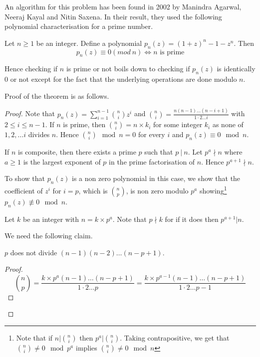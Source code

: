 An algorithm for this problem has been found in 2002 by Manindra Agarwal,
Neeraj Kayal and Nitin Saxena. In their result, they used the following
polynomial characterisation for a prime number.
\begin{theorem} Let $n \ge 1$ be
	an integer. Define a polynomial 
	$p_n(z) = (1+z)^n - 1 - z^n$. Then \[ p_n(z) \equiv 0 (mod~ n)
	\iff n \text{ is prime} \]
\end{theorem}
Hence checking if $n$ is prime or not boils down to checking if $p_n(z)$ is
identically $0$ or not except for the fact that the underlying operations are
done modulo $n$.

Proof of the theorem is as follows.
\begin{proof}
	Note that $p_n(z) = \sum_{i=1}^{n-1} \binom{n}{i} z^i$ and
	$\binom{n}{i} = \frac{n(n-1)\ldots (n-i+1)}{1\cdot 2 \ldots i}$ with $2
	\le i \le n-1$. 
	If $n$ is prime, then $\binom{n}{i} = n \times k_i$ for some integer
	$k_i$ as none of $1, 2, \ldots i$ divides $n$. Hence $\binom{n}{i}
	\mod n = 0$ for every $i$ and $p_n(z) \equiv 0 \mod n$.

	If $n$ is composite, then there exists a prime $p$ such that $p ~|~
	n$.  Let $p^a \nmid n$ where $a \ge 1$ is the largest exponent of $p$ in
	the prime factorisation of $n$. Hence $p^{a+1} \nmid n$.
	
	To show that $p_n(z)$ is a non zero polynomial in this case, we 
	show that the coefficient of $z^i$ for $i = p$, which is
	$\binom{n}{p}$, is non zero modulo $p^a$ showing\footnote{Note that if
		$n|\binom{n}{i}$ then $p^a | \binom{n}{i}$. Taking
		contrapositive, we get that $\binom{n}{i} \not = 0 \mod p^a$
		implies $\binom{n}{i} \not = 0 \mod n$} $p_n(z) \not \equiv 0
		\mod n$.
	

	\begin{observation}
	Let $k$ be an integer with $n = k \times p^a$. Note that $p \nmid k$
	for if it does then $p^{a+1} | n$. \label{obs:ag-bis-proof-fact}
	\end{observation}
	We need the following claim.
	\begin{claim}
		$p$ does not divide $(n-1)(n-2)\ldots (n-p+1)$. 
		\label{cl:ag-bis-main}
	\end{claim}
	\begin{proof}
		\begin{equation}
		\binom{n}{p} = \frac{k\times p^a(n-1)\ldots (n-p+1)}
		{1\cdot 2 \ldots p} = \frac{k\times p^{a-1}(n-1)\ldots 
			\label{eq:ag-bis-proof}
		(n-p+1)}{1\cdot 2 \ldots p-1} \end{equation}



\end{proof}
\end{proof}
